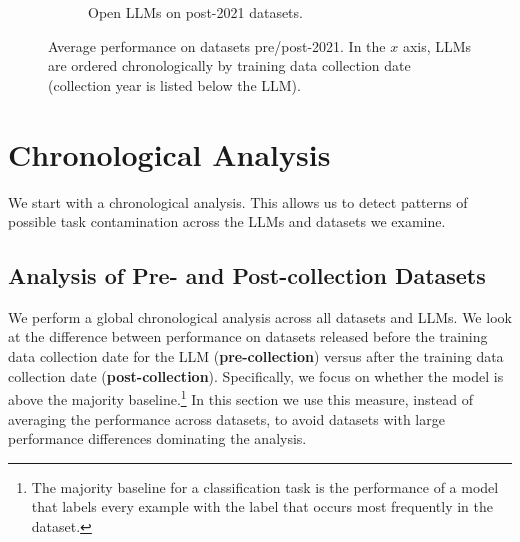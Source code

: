 \documentclass[letterpaper]{article} %
\newcommand{\jmf}[1]{}      %
\newcommand{\cm}[1]{}  %
\begin{document}
\begin{figure}[t]
\begin{subfigure}[b]{0.475\textwidth}
            \caption[]%
            {{Open LLMs on post-2021 datasets.}}    
            \label{fig:Open-newdatasets}
        \end{subfigure}
        \caption[]
        {Average performance on datasets pre/post-2021.  In the $x$ axis, LLMs are ordered chronologically by training data collection date (collection year is listed below the LLM).%
        } 
        \label{fig:experiments-average}
    \end{figure}







\section{Chronological Analysis}
\label{sec:chronological}
We start with a chronological analysis. This allows us to detect patterns of possible task contamination across the LLMs and datasets we examine.

\subsection{Analysis of Pre- and Post-collection Datasets}

We perform a global chronological analysis across all datasets and LLMs. We look at the difference between performance on datasets released before the training data collection date for the LLM (\textbf{pre-collection}) versus after the training data collection date (\textbf{post-collection}). Specifically, we focus on whether the model is above the majority baseline.\footnote{The majority baseline for a classification task is the performance of a model that labels every example with the label that occurs most frequently in the dataset.} In this section we use this measure, instead of averaging the performance across datasets, to avoid datasets with large performance differences dominating the analysis.
\end{document}
